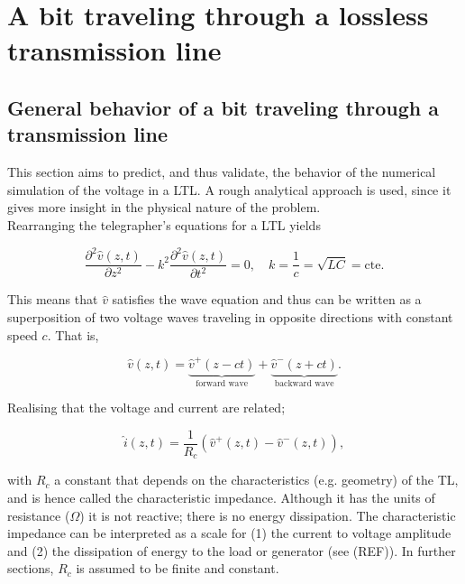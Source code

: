 \section{A bit traveling through a lossless transmission line}

\subsection{General behavior of a bit traveling through a transmission line}
This section aims to predict, and thus validate, the behavior of the numerical simulation of the voltage in a LTL. A rough analytical approach is used, since it gives more insight in the physical nature of the problem.  \\

Rearranging the telegrapher's equations for a LTL yields

\begin{equation}
\frac{\partial^2\hat{v}(z, t)}{\partial z^2} - k^2\frac{\partial^2 \hat{v}(z, t)}{\partial t^2} = 0, \quad k = \frac{1}{c}= \sqrt{LC} = \mathrm{cte}.
\label{tele}
\end{equation}

This means that $\hat{v}$ satisfies the wave equation and thus can be written as a superposition of two voltage waves traveling in opposite directions with constant speed $c$. That is,

\begin{equation}
\hat{v}(z, t) = \underbrace{\hat{v}^{+}(z - ct)}_{\text{forward wave}} + \underbrace{\hat{v}^{-}(z + ct)}_{\text{backward wave}}.
\end{equation}

Realising that the voltage and current are related;

\begin{equation}
\hat{i}(z, t) = \frac{1}{R_c}(\hat{v}^{+}(z, t) - \hat{v}^{-}(z, t)),
\end{equation}

with $R_c$ a constant that depends on the characteristics (e.g. geometry) of the TL, and is hence called the characteristic impedance. Although it has the units of resistance ($\Omega$) it is not reactive; there is no energy dissipation. The characteristic impedance can be interpreted as a scale for (1) the current to voltage amplitude and (2) the dissipation of energy to the load or generator (see (REF)). In further sections, $R_c$ is assumed to be finite and constant.

